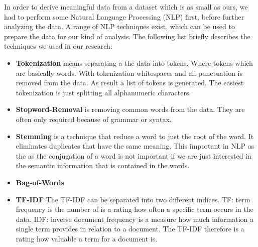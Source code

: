 In order to derive meaningful data from a dataset which is as small as ours, we had to perform some Natural Language Processing (NLP) first, before further analyzing the data. A range of NLP techniques exist, which can be used to prepare the data for our kind of analysis\cite{solangi_review_2018}\cite{ferrari_natural_2018}. The following list briefly describes the techniques we used in our research:

\begin{itemize}
	\item \textbf{Tokenization} means separating a the data into tokens. Where tokens which are basically words. With tokenization whitespaces and all punctuation is removed from the data. As result a list of tokens is generated. The easiest tokenization is just splitting all alphanumeric characters.
	\item \textbf{Stopword-Removal} is removing common words from the data. They are often only required because of grammar or syntax.
	\item \textbf{Stemming} is a technique that reduce a word to just the root of the word. It eliminates duplicates that have the same meaning. This important in NLP as the as the conjugation of a word is not important if we are just interested in the semantic information that is contained in the words.
	\item \textbf{Bag-of-Words}
	\item \textbf{TF-IDF} The TF-IDF can be separated into two different indices. TF: term frequency is the number of is a rating how often a specific term occurs in the data. IDF: inverse document frequency is a measure how much information a single term provides in relation to a document. The TF-IDF therefore is a rating how valuable a term for a document is.
\end{itemize}